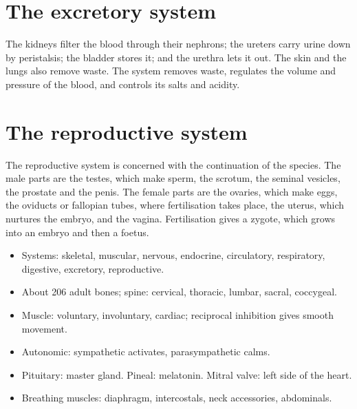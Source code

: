 
\section{The excretory system}

The kidneys filter the blood through their nephrons; the ureters carry urine down by peristalsis; the bladder stores it; and the urethra lets it out. The skin and the lungs also remove waste. The system removes waste, regulates the volume and pressure of the blood, and controls its salts and acidity.


\section{The reproductive system}

The reproductive system is concerned with the continuation of the species. The male parts are the testes, which make sperm, the scrotum, the seminal vesicles, the prostate and the penis. The female parts are the ovaries, which make eggs, the oviducts or fallopian tubes, where fertilisation takes place, the uterus, which nurtures the embryo, and the vagina. Fertilisation gives a zygote, which grows into an embryo and then a foetus.


\begin{recall}
\begin{itemize}
\item Systems: skeletal, muscular, nervous, endocrine, circulatory, respiratory, digestive, excretory, reproductive.
\item About 206 adult bones; spine: cervical, thoracic, lumbar, sacral, coccygeal.
\item Muscle: voluntary, involuntary, cardiac; reciprocal inhibition gives smooth movement.
\item Autonomic: sympathetic activates, parasympathetic calms.
\item Pituitary: master gland. Pineal: melatonin. Mitral valve: left side of the heart.
\item Breathing muscles: diaphragm, intercostals, neck accessories, abdominals.
\end{itemize}
\end{recall}

